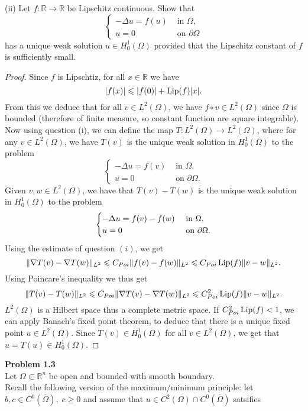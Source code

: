 \documentclass{article}
\newcommand{\R}{\mathbb{R}}
\DeclareMathOperator{\Lip}{\textup{Lip}}
\begin{document}
(ii) Let $f:\R\to\R$ be Lipschitz continuous. Show that
\[
\begin{cases}
    -\Delta u=f(u)&\text{ in }\Omega,\\
    u=0 &\text{ on }\partial \Omega
\end{cases}
\]
has a unique weak solution $u\in H_0^1(\Omega)$ provided that the Lipschitz constant of $f$ is sufficiently small.
\begin{proof}
    Since $f$ is Lipschtiz, for all $x\in\R$ we have
    \[
    |f(x)|\leqslant |f(0)|+\Lip(f)|x|.
    \]
    From this we deduce that for all $v\in L^2(\Omega)$, we have $f\circ v\in L^2(\Omega)$ since $\Omega$ is bounded (therefore of finite measure, so constant function are square integrable).\\
    Now using question (i), we can define the map $T:L^2(\Omega)\to L^2(\Omega)$, where for any $v\in L^2(\Omega)$, we have $T(v)$ is the unique weak solution in $H_0^1(\Omega)$ to the problem
    \[
    \begin{cases}
        -\Delta u=f(v)&\text{ in }\Omega,\\
        u=0&\text{ on }\partial\Omega.
    \end{cases}
    \]
    Given $v,w\in L^2(\Omega)$, we have that $T(v)-T(w)$ is the unique weak solution in $H_0^1(\Omega)$ to the problem
    \[
    \begin{cases}
        -\Delta u=f(v)-f(w)&\textup{ in }\Omega,\\
        u=0&\text{ on }\partial\Omega.
    \end{cases}
    \]
    Using the estimate of question $(i)$, we get
    \[
    \lVert\nabla T(v)-\nabla T(w)\rVert_{L^2}\leqslant C_{Poi}\lVert f(v)-f(w)\rVert_{L^2}\leqslant C_{Poi}\Lip(f)\lVert v-w\rVert_{L^2}.
    \]
    Using Poincare's inequality we thus get
    \[
    \lVert T(v)-T(w)\rVert_{L^2}\leqslant C_{Poi}\lVert \nabla T(v)-\nabla T(w)\rVert_{L^2}\leqslant C_{Poi}^2\Lip(f)\lVert v-w\rVert_{L^2}.
    \]
    $L^2(\Omega)$ is a Hilbert space thus a complete metric space. If $C_{Poi}^2\Lip(f)<1$, we can apply Banach's fixed point theorem, to deduce that there is a unique fixed point $u\in L^2(\Omega)$. Since $T(v)\in H_0^1(\Omega)$ for all $v\in L^2(\Omega)$, we get that $u=T(u)\in H_0^1(\Omega)$.
\end{proof}
\textbf{Problem 1.3}\\
Let $\Omega\subset\R^n$ be open and bounded with smooth boundary.\\
Recall the following version of the maximum/minimum principle: let $b,c\in C^0(\overline{\Omega}),\; c\geqslant 0$ and assume that $u\in C^2(\Omega)\cap C^0(\overline{\Omega})$ satsifies
\end{document}
